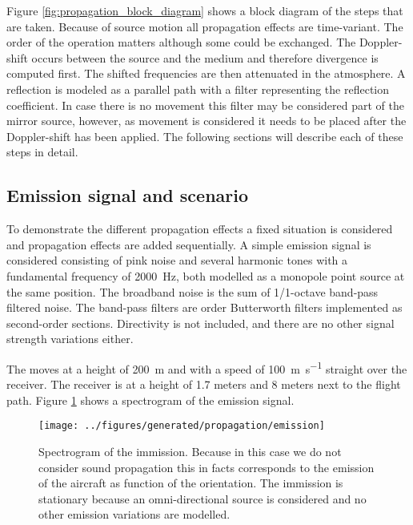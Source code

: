 Figure \ref{fig:propagation_block_diagram} shows a block diagram of the steps
that are taken. Because of source motion all propagation effects are
time-variant. The order of the operation matters although some could be
exchanged. The Doppler-shift occurs between the source and the medium and
therefore divergence is computed first. The shifted frequencies are then
attenuated in the atmosphere. A reflection is modeled as a parallel path with a
filter representing the reflection coefficient. In case there is no movement
this filter may be considered part of the mirror source, however, as movement is
considered it needs to be placed after the Doppler-shift has been applied. The
following sections will describe each of these steps in detail.

\subsection{Emission signal and scenario}
To demonstrate the different propagation effects a fixed situation is considered
and propagation effects are added sequentially. A simple emission signal is
considered consisting of pink noise and several harmonic tones with a
fundamental frequency of \SI{2000}{\hertz}, both modelled as a monopole point
source at the same position. The broadband noise is the sum of 1/1-octave
band-pass filtered noise. The band-pass filters are  order Butterworth
filters implemented as second-order sections. Directivity is not included, and
there are no other signal strength variations either.

The  moves at a height of \SI{200}{\meter} and with a
speed of \SI{100}{\meter\per\second} straight over the receiver.
The receiver is at a height of 1.7 meters and 8 meters next to the flight path.
Figure \ref{fig:implementation:propagation:emission} shows a spectrogram of the
emission signal.

\clearpage

\begin{figure}[H]
  \centering
  \texttt{[image: ../figures/generated/propagation/emission]}
  \caption{Spectrogram of the immission. Because in this case we do not consider sound propagation this in facts corresponds to the emission of the aircraft as function of the orientation. The immission is stationary because an omni-directional source is considered and no other emission variations are modelled.}
  \label{fig:implementation:propagation:emission}
\end{figure}


